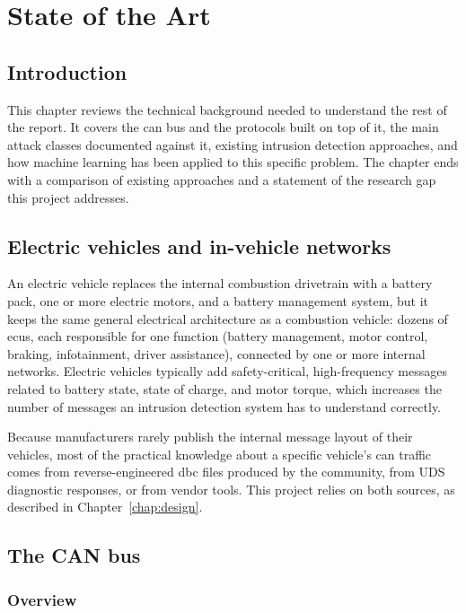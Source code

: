 \chapter{State of the Art}
\label{chap:sota}

\section{Introduction}

This chapter reviews the technical background needed to understand the rest of the report. It covers the \gls{can} bus and the protocols built on top of it, the main attack classes documented against it, existing intrusion detection approaches, and how machine learning has been applied to this specific problem. The chapter ends with a comparison of existing approaches and a statement of the research gap this project addresses.

\section{Electric vehicles and in-vehicle networks}

An electric vehicle replaces the internal combustion drivetrain with a battery pack, one or more electric motors, and a battery management system, but it keeps the same general electrical architecture as a combustion vehicle: dozens of \gls{ecu}s, each responsible for one function (battery management, motor control, braking, infotainment, driver assistance), connected by one or more internal networks. Electric vehicles typically add safety-critical, high-frequency messages related to battery state, state of charge, and motor torque, which increases the number of messages an intrusion detection system has to understand correctly.

Because manufacturers rarely publish the internal message layout of their vehicles, most of the practical knowledge about a specific vehicle's \gls{can} traffic comes from reverse-engineered \gls{dbc} files produced by the community, from UDS diagnostic responses, or from vendor tools. This project relies on both sources, as described in Chapter~\ref{chap:design}.

\section{The CAN bus}

\subsection{Overview}

